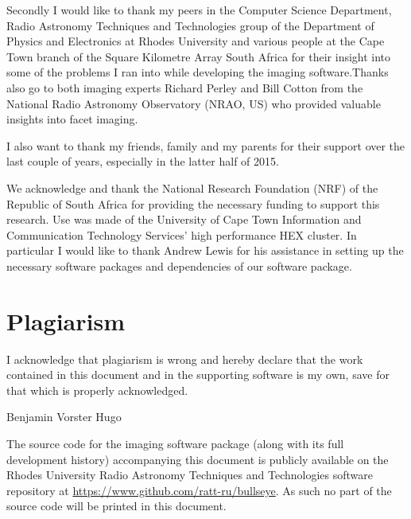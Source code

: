  Secondly I would like to thank my peers in the Computer Science Department, Radio Astronomy Techniques and Technologies group of the Department of Physics and Electronics at Rhodes University and
 various people at the Cape Town branch of the Square Kilometre Array South Africa for their insight into some of the problems I ran into while developing the imaging software.Thanks also go to both imaging
 experts Richard Perley and Bill Cotton from the National Radio Astronomy Observatory (NRAO, US) who provided valuable insights into facet imaging.
 
 I also want to thank my friends, family and my parents for their support over the last couple of years, especially in the latter half of 2015.
 
 We acknowledge and thank the National Research Foundation (NRF) of the Republic of South Africa for providing the necessary funding to support this research. Use was made of the University of Cape Town
 Information and Communication Technology Services' high performance HEX cluster. In particular I would like to thank Andrew Lewis for his assistance in setting up the necessary software packages and 
 dependencies of our software package.
\chapter*{Plagiarism}
 I acknowledge that plagiarism is wrong and hereby declare that the work contained in this document and in the supporting software is my own, save for that which is properly acknowledged.
 \vspace{55pt}
 
 Benjamin Vorster Hugo
 \clearpage
  \vspace*{\fill}
    \begin{center}
     \huge
     The source code for the imaging software package (along with its full development history) accompanying this document is publicly available on the Rhodes University Radio Astronomy 
     Techniques and Technologies software repository at \url{https://www.github.com/ratt-ru/bullseye}. As such no part of the source code will be printed in this document.
    \end{center}
  \vspace*{\fill}
 \clearpage
{\let\clearpage\relax \tableofcontents \listoffigures \listoftables}